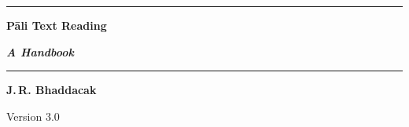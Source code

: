 \begin{titlepage}
\setcounter{page}{1}
\noindent\rule[6mm]{\linewidth}{0.7mm}
{\noindent\fontsize{32pt}{32pt}\upshape\bfseries Pāli Text Reading}\\[0.5\baselineskip]
\begin{flushright}
{\noindent\fontsize{18pt}{18pt}\itshape\bfseries A Handbook}\\[0.7\baselineskip]
\end{flushright}
\rule{\linewidth}{0.7mm}
\begin{flushright}
{\Large\bfseries J.\,R. Bhaddacak}\par
{}
{\noindent\ttfamily Version 3.0}
\end{flushright}
\end{titlepage}
\endinput
